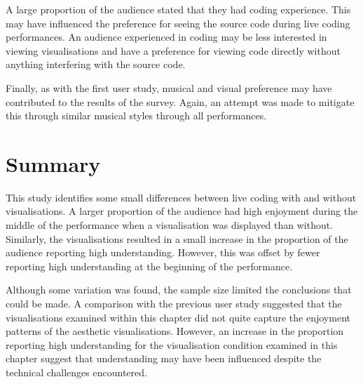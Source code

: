 A large proportion of the audience stated that they had coding experience. This may have influenced the preference for seeing the source code during live coding performances. An audience experienced in coding may be less interested in viewing visualisations and have a preference for viewing code directly without anything interfering with the source code.

Finally, as with the first user study, musical and visual preference may have contributed to the results of the survey. Again, an attempt was made to mitigate this through similar musical styles through all performances.

\section{Summary}

This study identifies some small differences between live coding with and without visualisations. A larger proportion of the audience had high enjoyment during the middle of the performance when a visualisation was displayed than without. Similarly, the visualisations resulted in a small increase in the proportion of the audience reporting high understanding. However, this was offset by fewer reporting high understanding at the beginning of the performance.

Although some variation was found, the sample size limited the conclusions that could be made. A comparison with the previous user study suggested that the visualisations examined within this chapter did not quite capture the enjoyment patterns of the aesthetic visualisations. However, an increase in the proportion reporting high understanding for the visualisation condition examined in this chapter suggest that understanding may have been influenced despite the technical challenges encountered.



